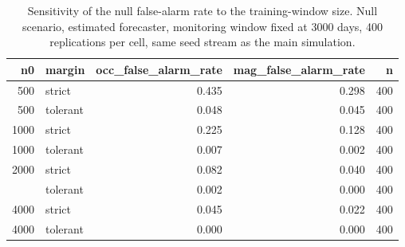 \begin{table}

\caption{Sensitivity of the null false-alarm rate to the training-window size. Null scenario, estimated forecaster, monitoring window fixed at 3000 days, 400 replications per cell, same seed stream as the main simulation.}
\centering
\begin{tabular}[t]{rlrrr}
\toprule
n0 & margin & occ\_false\_alarm\_rate & mag\_false\_alarm\_rate & n\\
\midrule
500 & strict & 0.435 & 0.298 & 400\\
500 & tolerant & 0.048 & 0.045 & 400\\
1000 & strict & 0.225 & 0.128 & 400\\
1000 & tolerant & 0.007 & 0.002 & 400\\
2000 & strict & 0.082 & 0.040 & 400\\
\addlinespace
2000 & tolerant & 0.002 & 0.000 & 400\\
4000 & strict & 0.045 & 0.022 & 400\\
4000 & tolerant & 0.000 & 0.000 & 400\\
\bottomrule
\end{tabular}
\end{table}
